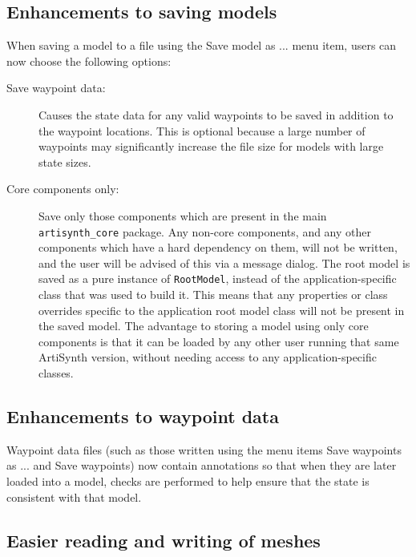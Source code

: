 \documentclass{article}
\begin{document}
\subsection*{Enhancements to saving models}

When saving a model to a file using the {\sf Save model as ...} menu
item, users can now choose the following options:

\begin{description}

\item[Save waypoint data:] \mbox{}

Causes the state data for any valid waypoints to be saved in addition
to the waypoint locations.  This is optional because a large number of
waypoints may significantly increase the file size for models with
large state sizes.

\item[Core components only:] \mbox{}

Save only those components which are present in the main {\tt
artisynth\_core} package. Any non-core components, and any other
components which have a hard dependency on them, will not be written,
and the user will be advised of this via a message dialog.  The root
model is saved as a pure instance of {\tt RootModel}, instead of the
application-specific class that was used to build it. This means that
any properties or class overrides specific to the application root
model class will not be present in the saved model. The advantage to
storing a model using only core components is that it can be loaded by
any other user running that same ArtiSynth version, without needing
access to any application-specific classes.

\end{description}

\subsection*{Enhancements to waypoint data}

Waypoint data files (such as those written using the menu items {\sf
Save waypoints as ...}  and {\sf Save waypoints}) now contain
annotations so that when they are later loaded into a model, checks
are performed to help ensure that the state is consistent with that
model.

\subsection*{Easier reading and writing of meshes}
\end{document}
